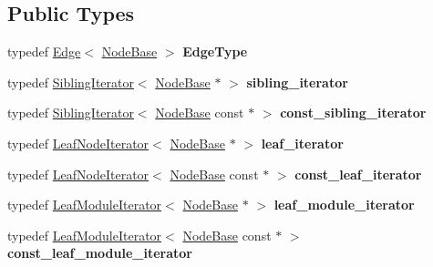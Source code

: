 \subsection*{Public Types}
\begin{DoxyCompactItemize}
\item 
\mbox{\label{classNodeBase_a99ca7ea74aecdfd800ff24a33c5b4402}} 
typedef \mbox{\hyperlink{classEdge}{Edge}}$<$ \mbox{\hyperlink{classNodeBase}{Node\+Base}} $>$ {\bfseries Edge\+Type}
\item 
\mbox{\label{classNodeBase_a82bf8eec4461892518140ad8be62467d}} 
typedef \mbox{\hyperlink{classSiblingIterator}{Sibling\+Iterator}}$<$ \mbox{\hyperlink{classNodeBase}{Node\+Base}} $\ast$ $>$ {\bfseries sibling\+\_\+iterator}
\item 
\mbox{\label{classNodeBase_aacd5c254f977b37ec713553ce53b5af0}} 
typedef \mbox{\hyperlink{classSiblingIterator}{Sibling\+Iterator}}$<$ \mbox{\hyperlink{classNodeBase}{Node\+Base}} const  $\ast$ $>$ {\bfseries const\+\_\+sibling\+\_\+iterator}
\item 
\mbox{\label{classNodeBase_ab2d5135f1f65e835167863077fd67a83}} 
typedef \mbox{\hyperlink{classLeafNodeIterator}{Leaf\+Node\+Iterator}}$<$ \mbox{\hyperlink{classNodeBase}{Node\+Base}} $\ast$ $>$ {\bfseries leaf\+\_\+iterator}
\item 
\mbox{\label{classNodeBase_afe773d4492cf6a7d99cbc56958684ed3}} 
typedef \mbox{\hyperlink{classLeafNodeIterator}{Leaf\+Node\+Iterator}}$<$ \mbox{\hyperlink{classNodeBase}{Node\+Base}} const  $\ast$ $>$ {\bfseries const\+\_\+leaf\+\_\+iterator}
\item 
\mbox{\label{classNodeBase_abd5e3ece83b8940d0cecc473ca33b514}} 
typedef \mbox{\hyperlink{classLeafModuleIterator}{Leaf\+Module\+Iterator}}$<$ \mbox{\hyperlink{classNodeBase}{Node\+Base}} $\ast$ $>$ {\bfseries leaf\+\_\+module\+\_\+iterator}
\item 
\mbox{\label{classNodeBase_ad25293ac11c249fba5624ce271d45e8b}} 
typedef \mbox{\hyperlink{classLeafModuleIterator}{Leaf\+Module\+Iterator}}$<$ \mbox{\hyperlink{classNodeBase}{Node\+Base}} const  $\ast$ $>$ {\bfseries const\+\_\+leaf\+\_\+module\+\_\+iterator}

\end{DoxyCompactItemize}
